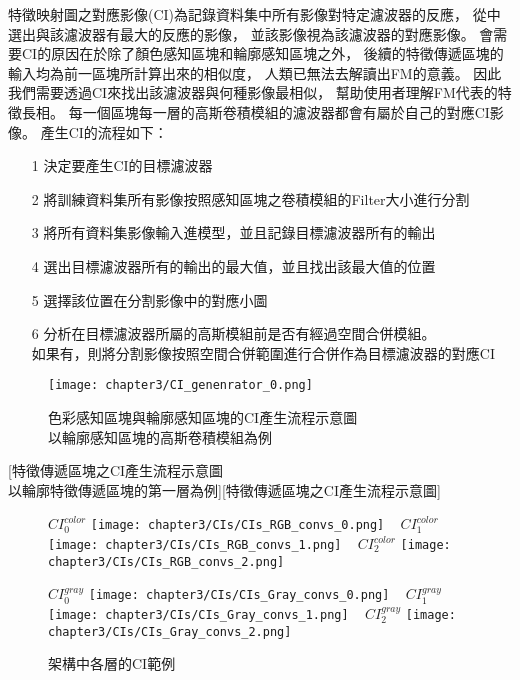 \documentclass[class=NCU_thesis, crop=false]{standalone}
\begin{document}
	特徵映射圖之對應影像(CI)為記錄資料集中所有影像對特定濾波器的反應，
	從中選出與該濾波器有最大的反應的影像，
	並該影像視為該濾波器的對應影像。
	會需要CI的原因在於除了顏色感知區塊和輪廓感知區塊之外，
	後續的特徵傳遞區塊的輸入均為前一區塊所計算出來的相似度，
	人類已無法去解讀出FM的意義。
	因此我們需要透過CI來找出該濾波器與何種影像最相似，
	幫助使用者理解FM代表的特徵長相。
	每一個區塊每一層的高斯卷積模組的濾波器都會有屬於自己的對應CI影像。
	產生CI的流程如下：
	\begin{itemize}
		\item [1]
		決定要產生CI的目標濾波器
		\item [2]
		將訓練資料集所有影像按照感知區塊之卷積模組的Filter大小進行分割
		\item [3]
		將所有資料集影像輸入進模型，並且記錄目標濾波器所有的輸出
		\item [4]
		選出目標濾波器所有的輸出的最大值，並且找出該最大值的位置
		\item [5]
		選擇該位置在分割影像中的對應小圖
		\item [6]
		分析在目標濾波器所屬的高斯模組前是否有經過空間合併模組。\\
		如果有，則將分割影像按照空間合併範圍進行合併作為目標濾波器的對應CI
	\end{itemize}


	\begin{figure}[H]
	\centering
	\label{fig:CI_generator_0}
	\captionsetup{justification=centering}
	\caption{色彩感知區塊與輪廓感知區塊的CI產生流程示意圖 \\ 以輪廓感知區塊的高斯卷積模組為例}
	\texttt{[image: chapter3/CI\_genenrator\_0.png]}
	\end{figure}

	[特徵傳遞區塊之CI產生流程示意圖 \\
	以輪廓特徵傳遞區塊的第一層為例][特徵傳遞區塊之CI產生流程示意圖]

	\begin{figure}[H]
    \centering
    \subcaptionbox
        {$CI^{color}_0$
        \label{fig:CI_color_0}}
        {\texttt{[image: chapter3/CIs/CIs\_RGB\_convs\_0.png]}}
    ~
    \subcaptionbox
        {$CI^{color}_1$
        \label{fig:CI_color_1}}
        {\texttt{[image: chapter3/CIs/CIs\_RGB\_convs\_1.png]}}
    ~
    \subcaptionbox
        {$CI^{color}_2$
        \label{fig:CI_color_2}}
        {\texttt{[image: chapter3/CIs/CIs\_RGB\_convs\_2.png]}}

     \subcaptionbox
        {$CI^{gray}_0$
        \label{fig:CI_gray_0}}
        {\texttt{[image: chapter3/CIs/CIs\_Gray\_convs\_0.png]}}
    ~
    \subcaptionbox
        {$CI^{gray}_1$
        \label{fig:CI_gray_1}}
        {\texttt{[image: chapter3/CIs/CIs\_Gray\_convs\_1.png]}}
    ~
    \subcaptionbox
        {$CI^{gray}_2$
        \label{fig:CI_gray_2}}
        {\texttt{[image: chapter3/CIs/CIs\_Gray\_convs\_2.png]}}
    \caption{架構中各層的CI範例}
    \label{fig:CIs}
	\end{figure}
\end{document}
